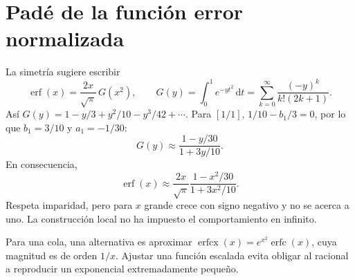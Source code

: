 \documentclass[11pt,a4paper]{article}
\newcommand{\dd}{\,\mathrm d}
\theoremstyle{definition}
\DeclareMathOperator{\erf}{erf}
\DeclareMathOperator{\erfc}{erfc}
\DeclareMathOperator{\erfcx}{erfcx}
\begin{document}
\section{Padé de la función error normalizada}
La simetría sugiere escribir
\[
\erf(x)=\frac{2x}{\sqrt\pi}\,G(x^2),\qquad
G(y)=\int_0^1e^{-yt^2}\dd t
=\sum_{k=0}^\infty\frac{(-y)^k}{k!(2k+1)}.
\]
Así $G(y)=1-y/3+y^2/10-y^3/42+\cdots$. Para $[1/1]$, $1/10-b_1/3=0$, por lo que $b_1=3/10$ y $a_1=-1/30$:
\[
G(y)\approx\frac{1-y/30}{1+3y/10}.
\]
En consecuencia,
\[
\erf(x)\approx\frac{2x}{\sqrt\pi}
\frac{1-x^2/30}{1+3x^2/10}.
\]
Respeta imparidad, pero para $x$ grande crece con signo negativo y no se acerca a uno. La construcción local no ha impuesto el comportamiento en infinito.

Para una cola, una alternativa es aproximar $\erfcx(x)=e^{x^2}\erfc(x)$, cuya magnitud es de orden $1/x$. Ajustar una función escalada evita obligar al racional a reproducir un exponencial extremadamente pequeño.
\end{document}
